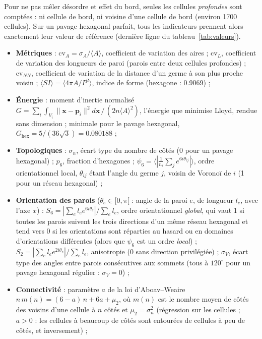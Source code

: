 \documentclass[10pt,a4paper]{article}
\newcommand{\vect}[1]{\boldsymbol{#1}}
\begin{document}
Pour ne pas mêler désordre et effet du bord, seules les cellules \emph{profondes} sont comptées : ni cellule de
bord, ni voisine d'une cellule de bord (environ 1700 cellules). Sur un pavage hexagonal parfait, tous les
indicateurs prennent alors exactement leur valeur de référence (dernière ligne du tableau~\ref{tab:valeurs}).
\begin{itemize}
  \item \textbf{Métriques} :
    $\mathrm{cv}_A=\sigma_A/\langle A\rangle$, coefficient de variation des aires ;
    $\mathrm{cv}_L$, coefficient de variation des longueurs de paroi (parois entre deux cellules profondes) ;
    $\mathrm{cv}_{NN}$, coefficient de variation de la distance d'un germe à son plus proche voisin ;
    $\langle SI\rangle=\langle4\pi A/P^2\rangle$, indice de forme (hexagone : 0.9069) ;
  \item \textbf{Énergie} : moment d'inertie normalisé
    $G=\sum_i\int_{V_i}\|\vect x-\vect p_i\|^2d\vect x\,/\,(2n\langle A\rangle^2)$, l'énergie que minimise Lloyd,
    rendue sans dimension ; minimale pour le pavage hexagonal, $G_{\mathrm{hex}}=5/(36\sqrt3)=0.080188$ ;
  \item \textbf{Topologiques} : $\sigma_n$, écart type du nombre de côtés (0 pour un pavage hexagonal) ; $p_6$,
    fraction d'hexagones ; $\psi_6=\langle|\frac1{n_i}\sum_j e^{6i\theta_{ij}}|\rangle$, ordre orientationnel
    local, $\theta_{ij}$ étant l'angle du germe $j$, voisin de Voronoï de $i$ (1 pour un réseau hexagonal) ;
  \item \textbf{Orientation des parois} ($\theta_e\in[0,\pi[$ : angle de la paroi $e$, de longueur $l_e$, avec
    l'axe $x$) :
    $S_6=|\sum_e l_e e^{6i\theta_e}|/\sum_e l_e$, ordre orientationnel \emph{global}, qui vaut 1 si toutes les
    parois suivent les trois directions d'un même réseau hexagonal et tend vers 0 si les orientations sont
    réparties au hasard ou en domaines d'orientations différentes (alors que $\psi_6$ est un ordre \emph{local}) ;
    $S_2=|\sum_e l_e e^{2i\theta_e}|/\sum_e l_e$, anisotropie (0 sans direction privilégiée) ;
    $\sigma_V$, écart type des angles entre parois consécutives aux sommets (tous à $120^\circ$ pour un pavage
    hexagonal régulier : $\sigma_V=0$) ;
  \item \textbf{Connectivité} :
    paramètre $a$ de la loi d'Aboav--Weaire $n\,m(n)=(6-a)\,n+6a+\mu_2$, où $m(n)$ est le nombre moyen de côtés
    des voisins d'une cellule à $n$ côtés et $\mu_2=\sigma_n^2$ (régression sur les cellules ; $a>0$ : les cellules
    à beaucoup de côtés sont entourées de cellules à peu de côtés, et inversement) ;

\end{itemize}
\end{document}
